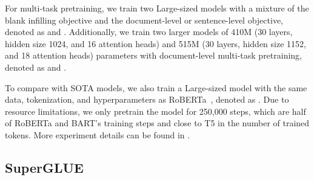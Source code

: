 For multi-task pretraining, we train two Large-sized models with a mixture of the blank infilling objective and the document-level or sentence-level objective, denoted as \docmodel and \sentmodel.  Additionally, we train two larger \model models of 410M (30 layers, hidden size 1024, and 16 attention heads) and 515M (30 layers, hidden size 1152, and 18 attention heads) parameters with document-level multi-task pretraining, denoted as \modelx and \modelx.




To compare with SOTA models, we also train a Large-sized model with the same data, tokenization, and hyperparameters as RoBERTa~\cite{RoBERTa}, denoted as \modelx\roberta.
Due to resource limitations, we only pretrain the model for 250,000 steps, which are half of RoBERTa and BART's training steps and close to T5 in the number of trained tokens. 
More experiment details can be found in .

\begin{table*}
    \caption{Results of abstractive summarization on the CNN/DailyMail and XSum test sets.}
    \label{tab:cnndm_xsum}
    \centering
\small
\end{table*}

\subsection{SuperGLUE}
\label{subsec:single_obj}

